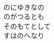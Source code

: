 \documentclass[10pt,b5j]{tarticle} %
\begin{document}
\begin{enumerate}
\begin{minipage}[c]{\blocksize}
        \vspace{\linespace}
        \item~\\
        のにゆきなの\\
        のがつるとも\\
        そのもてとして\\
        すはのへなり
    
    \end{minipage}
\end{enumerate} %
\end{document}
